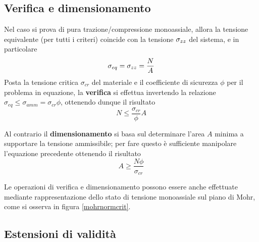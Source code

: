 	\subsection{Verifica e dimensionamento}
		Nel caso si prova di pura trazione/compressione monoassiale, allora la tensione equivalente (per tutti i criteri) coincide con la tensione $\sigma_{zz}$ del sistema, e in particolare
		\[ \sigma_{eq} = \sigma_{zz} = \frac NA \]
		Posta la tensione critica $\sigma_{cr}$ del materiale e il coefficiente di sicurezza $\phi$ per il problema in equazione, la \textbf{verifica} si effettua invertendo la relazione $\sigma_{eq} \leq \sigma_{amm} = \sigma_{cr}\phi$, ottenendo dunque il risultato
		\[ N \leq \frac{\sigma_{cr}}{\phi} A \]
		
		Al contrario il \textbf{dimensionamento} si basa sul determinare l'area $A$ minima a supportare la tensione ammissibile; per fare questo è sufficiente manipolare l'equazione precedente ottenendo il risultato
		\[ A \geq \frac{N\phi}{\sigma_{cr}	} \]
		
		Le operazioni di verifica e dimensionamento possono essere anche effettuate mediante rappresentazione dello stato di tensione monoassiale sul piano di Mohr, come si osserva in figura \ref{mohrnormcrit}.
		
		
	\subsection{Estensioni di validità}
